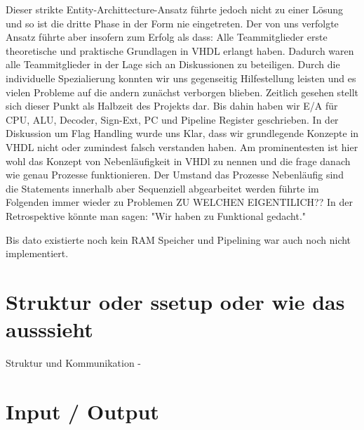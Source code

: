 \documentclass[paper=a4,fontsize=12pt]{scrreprt}
\begin{document}
Dieser strikte Entity-Archittecture-Ansatz führte jedoch nicht zu einer Lösung und so ist die dritte Phase in der Form nie eingetreten. Der von uns verfolgte Ansatz führte aber insofern zum Erfolg als dass: Alle Teammitglieder erste theoretische und praktische Grundlagen in VHDL erlangt haben. 
Dadurch waren alle Teammitglieder in der Lage sich an Diskussionen zu beteiligen. Durch die individuelle Spezialierung konnten wir uns gegenseitig Hilfestellung leisten und es vielen Probleme auf die andern zunächst verborgen blieben. Zeitlich gesehen stellt sich dieser Punkt als Halbzeit des Projekts dar.
Bis dahin haben wir E/A für CPU, ALU, Decoder, Sign-Ext, PC und Pipeline Register geschrieben. 
In der Diskussion um Flag Handling wurde uns Klar, dass wir grundlegende Konzepte in VHDL nicht oder zumindest falsch verstanden haben. Am prominentesten ist hier wohl das Konzept von Nebenläufigkeit in VHDl zu nennen und die frage danach wie genau Prozesse funktionieren. Der Umstand das Prozesse Nebenläufig sind die Statements innerhalb aber Sequenziell abgearbeitet werden führte im Folgenden immer wieder zu Problemen {\color{red}ZU WELCHEN EIGENTILICH??} 
In der Retrospektive könnte man sagen: "Wir haben zu Funktional gedacht."  


Bis dato existierte noch kein RAM Speicher und Pipelining war auch noch nicht implementiert.


\section{Struktur oder ssetup oder wie das ausssieht}
Struktur und Kommunikation - 

\section{Input / Output}
\end{document}
